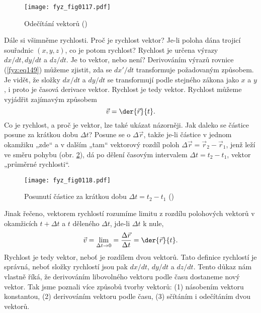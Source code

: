     \begin{figure}[ht!]  %
      \centering
      \texttt{[image: fyz\_fig0117.pdf]}
      \caption{Odečítání vektorů
              (\cite[s.~161]{Feynman01})}
      \label{fyz:fig0117}
    \end{figure}
    Dále si všimněme rychlosti. Proč je rychlost vektor? Je-li poloha dána trojicí souřadnic 
    \((x,y, z)\), co je potom rychlost? Rychlost je určena výrazy \(dx/dt, dy/dt\) a \(dz/dt\). Je 
    to vektor, nebo není? Derivováním výrazů rovnice (\ref{fyz:eq149}) můžeme zjistit, zda se 
    \(dx'/dt\) transformuje požadovaným způsobem. Je vidět, že složky \(dx/dt\) a \(dy/dt\) se 
    transformují podle stejného zákona jako \(x\) a \(y\), i proto je časová derivace vektor. 
    Rychlost je tedy vektor. Rychlost můžeme vyjádřit zajímavým způsobem
    \begin{equation*}
      \vec{v} = \der{\vec{r}}{t}.
    \end{equation*}    
    Co je rychlost, a proč je vektor, lze také ukázat názorněji. Jak daleko se částice posune za 
    krátkou dobu \(\Delta t\)? Posune se o \(\Delta\vec{r}\), takže je-li částice v jednom okamžiku 
    „zde“ a v dalším „tam“ vektorový rozdíl poloh \(\Delta\vec{r} = \vec{r}_2 - \vec{r}_1\), jenž 
    leží ve směru pohybu (obr. \ref{fyz:fig0118}), dá po dělení časovým intervalem \(\Delta t = t_2 
    - t_1\), vektor „průměrné rychlosti“.

    \begin{figure}[ht!]  %
      \centering
      \texttt{[image: fyz\_fig0118.pdf]}
      \caption{Posunutí částice za krátkou dobu \(\Delta t = t_2 - t_1\)
              (\cite[s.~162]{Feynman01})}
      \label{fyz:fig0118}
    \end{figure}
    Jinak řečeno, vektorem rychlostí rozumíme limitu z rozdílu polohových vektorů v okamžicích \(t 
    + \Delta t\) a \(t\) děleného \(\Delta t\), jde-li \(\Delta t\) k nule,
    \begin{equation}\label{fyz:eq154}
      \vec{v} = \lim\limits_{\Delta t\to0} = \frac{\Delta\vec{r}}{\Delta t}
              = \der{\vec{r}}{t}.
    \end{equation}
    Rychlost je tedy vektor, neboť je rozdílem dvou vektorů. Tato definice rychlostí je správná, 
    neboť složky rychlostí jsou pak \(dx/dt\), \(dy/dt\) a \(dz/dt\). Tento důkaz nám vlastně říká, 
    že derivováním libovolného vektoru podle času dostaneme nový vektor. Tak jsme poznali více 
    způsobů tvorby vektorů: (1) násobením vektoru konstantou, (2) derivováním vektoru podle času, 
    (3) sčítáním i odečítáním dvou vektorů. 

